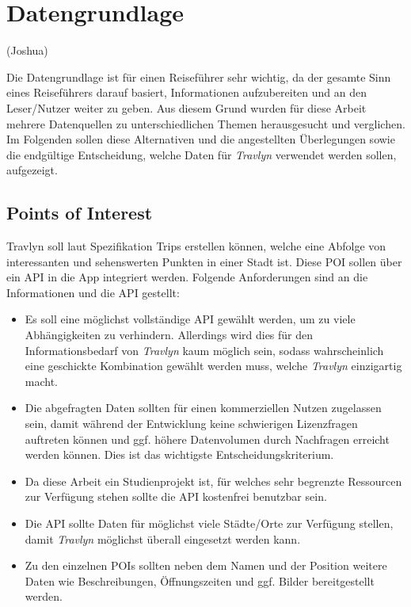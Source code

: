 \chapter{Datengrundlage}
(Joshua)

Die Datengrundlage ist für einen Reiseführer sehr wichtig, da der gesamte Sinn eines Reiseführers darauf basiert, Informationen aufzubereiten und an den Leser/Nutzer weiter zu geben. Aus diesem Grund wurden für diese Arbeit mehrere Datenquellen zu unterschiedlichen Themen herausgesucht und verglichen. Im Folgenden sollen diese Alternativen und die angestellten Überlegungen sowie die endgültige Entscheidung, welche Daten für \textit{Travlyn} verwendet werden sollen, aufgezeigt.

\section{Points of Interest}
Travlyn soll laut Spezifikation Trips erstellen können, welche eine Abfolge von interessanten und sehenswerten Punkten in einer Stadt ist. Diese \ac{POI} sollen über ein \ac{API} in die App integriert werden. Folgende Anforderungen sind an die Informationen und die API gestellt:

\begin{itemize}
	\item Es soll eine möglichst vollständige \acs{API} gewählt werden, um zu viele Abhängigkeiten zu verhindern. Allerdings wird dies für den Informationsbedarf von \textit{Travlyn} kaum möglich sein, sodass wahrscheinlich eine geschickte Kombination gewählt werden muss, welche \textit{Travlyn} einzigartig macht.
	\item Die abgefragten Daten sollten für einen kommerziellen Nutzen zugelassen sein, damit während der Entwicklung keine schwierigen Lizenzfragen auftreten können und ggf. höhere Datenvolumen durch Nachfragen erreicht werden können. Dies ist das wichtigste Entscheidungskriterium.
	\item Da diese Arbeit ein Studienprojekt ist, für welches sehr begrenzte Ressourcen zur Verfügung stehen sollte die API kostenfrei benutzbar sein.  
	\item Die API sollte Daten für möglichst viele Städte/Orte zur Verfügung stellen, damit \textit{Travlyn} möglichst überall eingesetzt werden kann.
	\item Zu den einzelnen POIs sollten neben dem Namen und der Position weitere Daten wie Beschreibungen, Öffnungszeiten und ggf. Bilder bereitgestellt werden.
\end{itemize}

